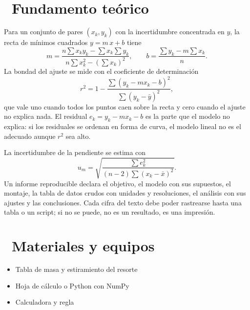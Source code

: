 \documentclass[11pt,a4paper]{article}
\newcommand{\iconotexto}[2]{\textcolor{cyanNeon}{\faIcon{#1}}~#2}
\begin{document}
\section{\iconotexto{book-open}{Fundamento teórico}}

Para un conjunto de pares $(x_k,y_k)$ con la incertidumbre concentrada en
$y$, la recta de mínimos cuadrados $y = m\,x + b$ tiene
\[
  m = \frac{n\sum x_k y_k - \sum x_k \sum y_k}
           {n\sum x_k^2 - \left(\sum x_k\right)^2},
  \qquad
  b = \frac{\sum y_k - m\sum x_k}{n}.
\]
La bondad del ajuste se mide con el coeficiente de determinación
\[
  r^2 = 1 - \frac{\sum (y_k - m x_k - b)^2}
               {\sum (y_k - \bar{y})^2},
\]
que vale uno cuando todos los puntos caen sobre la recta y cero cuando el
ajuste no explica nada. El residual $e_k = y_k - m x_k - b$ es la parte
que el modelo no explica: si los residuales se ordenan en forma de curva,
el modelo lineal no es el adecuado aunque $r^2$ sea alto.

La incertidumbre de la pendiente se estima con
\[
  u_m = \sqrt{\frac{\sum e_k^2}{(n-2)\sum (x_k-\bar{x})^2}}.
\]
Un informe reproducible declara el objetivo, el modelo con sus
supuestos, el montaje, la tabla de datos crudos con unidades y
resoluciones, el análisis con sus ajustes y las conclusiones. Cada cifra
del texto debe poder rastrearse hasta una tabla o un script; si no se
puede, no es un resultado, es una impresión.

\begin{center}
\par{}
\end{center}

\section{\iconotexto{box-open}{Materiales y equipos}}

\begin{itemize}[leftmargin=1.4em,itemsep=2pt,topsep=3pt]
  \item Tabla de masa y estiramiento del resorte
  \item Hoja de cálculo o Python con NumPy
  \item Calculadora y regla
\end{itemize}
\end{document}
